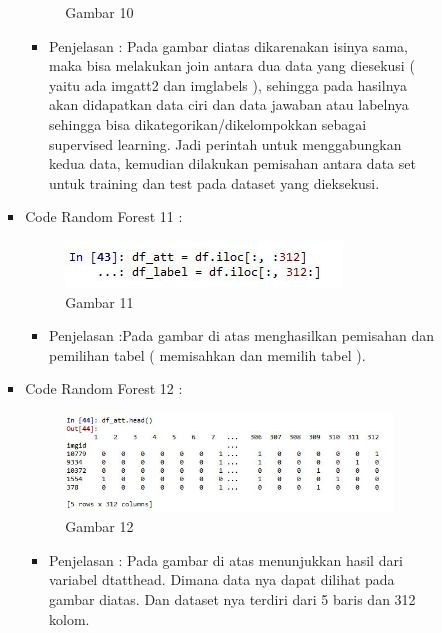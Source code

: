 \begin{enumerate}
\begin{itemize}
\begin{itemize}
\begin{itemize}
\begin{figure}[ht]
\caption{Gambar 10}
\label{contoh}
\end{figure}
\par
\begin{itemize}
\item Penjelasan : Pada gambar diatas dikarenakan isinya sama, maka bisa melakukan join antara dua data yang diesekusi ( yaitu ada imgatt2 dan imglabels ), sehingga pada hasilnya akan didapatkan data ciri dan data jawaban atau labelnya sehingga bisa dikategorikan/dikelompokkan sebagai supervised learning. Jadi perintah untuk menggabungkan kedua data, kemudian dilakukan pemisahan antara data set untuk training dan test pada dataset yang dieksekusi.
\par
\par
\end{itemize}
\item Code Random Forest 11 :
\par
\begin{figure}[ht]
\centering
\includegraphics[scale=0.7]{figures/cod11.jpg}
\caption{Gambar 11}
\label{contoh}
\end{figure}
\par
\begin{itemize}
\item Penjelasan :Pada gambar di atas menghasilkan pemisahan dan pemilihan tabel ( memisahkan dan memilih tabel ). 
\par
\par
\end{itemize}
\item Code Random Forest 12 :
\par
\begin{figure}[ht]
\centering
\includegraphics[scale=0.7]{figures/cod12.jpg}
\caption{Gambar 12}
\label{contoh}
\end{figure}
\par
\begin{itemize}
\item Penjelasan : Pada gambar di atas menunjukkan hasil dari variabel dtatthead. Dimana data nya dapat dilihat pada gambar diatas. Dan dataset nya terdiri dari 5 baris dan 312 kolom.

\end{itemize}
\end{itemize}
\end{itemize}
\end{itemize}
\end{enumerate}
